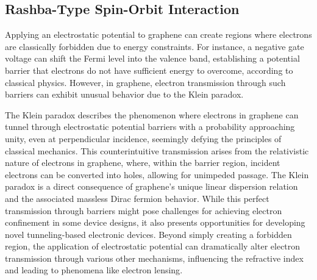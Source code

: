 %

    \subsection{Rashba-Type Spin-Orbit Interaction}\label{subsec:rashba-type-spin-orbit-interaction}

Applying an electrostatic potential to graphene can create regions where electrons are classically forbidden due to energy constraints\cite{SoninPhysRevB2009}.
For instance, a negative gate voltage can shift the Fermi level into the valence band, establishing a potential barrier that electrons do not have sufficient energy to overcome, according to classical physics\cite{DellAnnaJPhysCondMatt2018}.
However, in graphene, electron transmission through such barriers can exhibit unusual behavior due to the Klein paradox.

The Klein paradox describes the phenomenon where electrons in graphene can tunnel through electrostatic potential barriers with a probability approaching unity, even at perpendicular incidence, seemingly defying the principles of classical mechanics\cite{TrauzettelNature2007}.
This counterintuitive transmission arises from the relativistic nature of electrons in graphene, where, within the barrier region, incident electrons can be converted into holes, allowing for unimpeded passage\cite{BernardiniJPhysAMathTheor2010}.
The Klein paradox is a direct consequence of graphene's unique linear dispersion relation and the associated massless Dirac fermion behavior.
While this perfect transmission through barriers might pose challenges for achieving electron confinement in some device designs, it also presents opportunities for developing novel tunneling-based electronic devices.
Beyond simply creating a forbidden region, the application of electrostatic potential can dramatically alter electron transmission through various other mechanisms, influencing the refractive index and leading to phenomena like electron lensing\cite{ParedesPhysRevB2021}.

